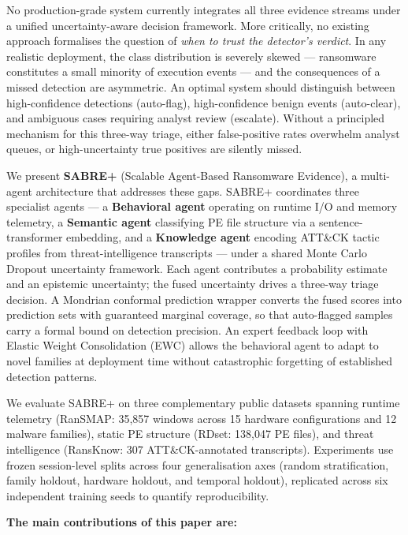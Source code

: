 \documentclass[journal]{IEEEtran}
\begin{document}
No production-grade system currently integrates all three evidence streams
under a unified uncertainty-aware decision framework.
More critically, no existing approach formalises the question of \emph{when
to trust the detector's verdict}.
In any realistic deployment, the class distribution is severely skewed ---
ransomware constitutes a small minority of execution events --- and the
consequences of a missed detection are asymmetric.
An optimal system should distinguish between high-confidence detections
(auto-flag), high-confidence benign events (auto-clear), and ambiguous cases
requiring analyst review (escalate).
Without a principled mechanism for this three-way triage, either false-positive
rates overwhelm analyst queues, or high-uncertainty true positives are silently
missed.

We present \textbf{SABRE+} (Scalable Agent-Based Ransomware Evidence),
a multi-agent architecture that addresses these gaps.
SABRE+ coordinates three specialist agents --- a \textbf{Behavioral agent}
operating on runtime I/O and memory telemetry, a \textbf{Semantic agent}
classifying PE file structure via a sentence-transformer embedding, and a
\textbf{Knowledge agent} encoding ATT\&CK tactic profiles from
threat-intelligence transcripts --- under a shared Monte Carlo Dropout
uncertainty framework.
Each agent contributes a probability estimate and an epistemic uncertainty;
the fused uncertainty drives a three-way triage decision.
A Mondrian conformal prediction wrapper converts the fused scores into
prediction sets with guaranteed marginal coverage, so that auto-flagged
samples carry a formal bound on detection precision.
An expert feedback loop with Elastic Weight Consolidation (EWC) allows the
behavioral agent to adapt to novel families at deployment time without
catastrophic forgetting of established detection patterns.

We evaluate SABRE+ on three complementary public datasets spanning runtime
telemetry (RanSMAP: 35,857 windows across 15 hardware configurations and 12
malware families), static PE structure (RDset: 138,047 PE files), and threat
intelligence (RansKnow: 307 ATT\&CK-annotated transcripts).
Experiments use frozen session-level splits across four generalisation axes
(random stratification, family holdout, hardware holdout, and temporal
holdout), replicated across six independent training seeds to quantify
reproducibility.

\textbf{The main contributions of this paper are:}
\end{document}
